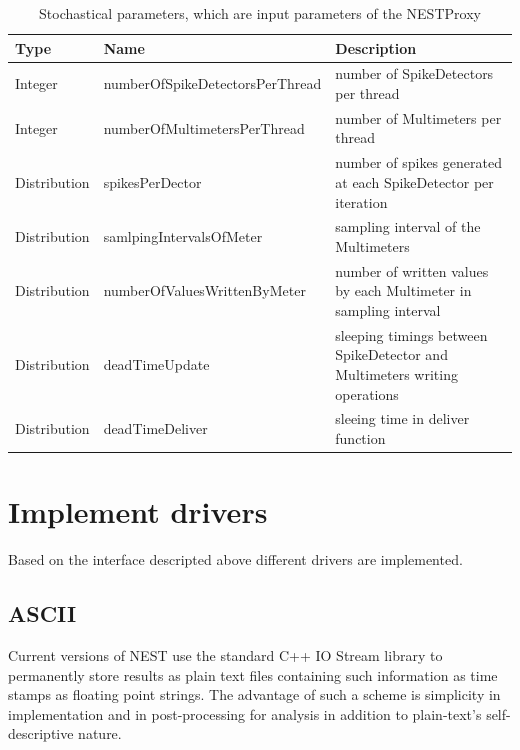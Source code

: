 \documentclass[]{YIC2015}
\begin{document}
\begin{table}[htdp]
\caption{Stochastical parameters, which are input parameters of the NESTProxy}
\centering
\begin{tabular}{lll}
\hline\hline
\textbf{Type} & \textbf{Name} & \textbf{Description} \\ \hline
Integer &   numberOfSpikeDetectorsPerThread & number of SpikeDetectors per thread  \\
Integer &   numberOfMultimetersPerThread & number of Multimeters per thread  \\
Distribution &   spikesPerDector & number of spikes generated at each SpikeDetector per iteration  \\
Distribution &   samlpingIntervalsOfMeter & sampling interval of the Multimeters  \\
Distribution &   numberOfValuesWrittenByMeter & number of written values by each Multimeter in sampling interval  \\
Distribution  &  deadTimeUpdate & sleeping timings between SpikeDetector and Multimeters writing operations \\
Distribution &   deadTimeDeliver & sleeing time in deliver function  \\
\hline\hline
\end{tabular}
\label{tab:table-silva1}
\end{table}


\section{Implement drivers}
Based on the interface descripted above different drivers are
implemented.

\subsection{ASCII}
Current versions of NEST use the standard C++ IO Stream library
\cite{stream} to permanently store results as plain text files
containing such information as time stamps as floating point
strings. The advantage of such a scheme is simplicity in
implementation and in post-processing for analysis in addition to
plain-text's self-descriptive nature.
\end{document}
